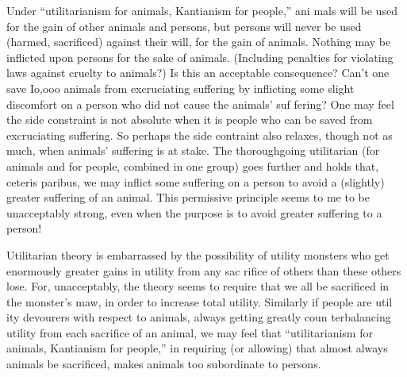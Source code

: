 \documentclass[11pt,openany]{book}
\begin{document}
Under ``utilitarianism for animals, Kantianism for people,'' ani mals will be used for the gain of other animals and persons, but persons will never be used (harmed, sacrificed) against their will, for the gain of animals. Nothing may be inflicted upon persons for the sake of animals. (Including penalties for violating laws against cruelty to animals?) Is this an acceptable consequence? Can't one save Io,ooo animals from excruciating suffering by inflicting some slight discomfort on a person who did not cause the animals' suf fering? One may feel the side constraint is not absolute when it is people who can be saved from excruciating suffering. So perhaps the side contraint also relaxes, though not as much, when animals' suffering is at stake. The thoroughgoing utilitarian (for animals and for people, combined in one group) goes further and holds that, ceteris paribus, we may inflict some suffering on a person to avoid a (slightly) greater suffering of an animal. This permissive principle seems to me to be unacceptably strong, even when the purpose is to avoid greater suffering to a person! 

Utilitarian theory is embarrassed by the possibility of utility monsters who get enormously greater gains in utility from any sac rifice of others than these others lose. For, unacceptably, the theory seems to require that we all be sacrificed in the monster's maw, in order to increase total utility. Similarly if people are util ity devourers with respect to animals, always getting greatly coun terbalancing utility from each sacrifice of an animal, we may feel that ``utilitarianism for animals, Kantianism for people,'' in requiring (or allowing) that almost always animals be sacrificed, makes animals too subordinate to persons. 
\end{document}
